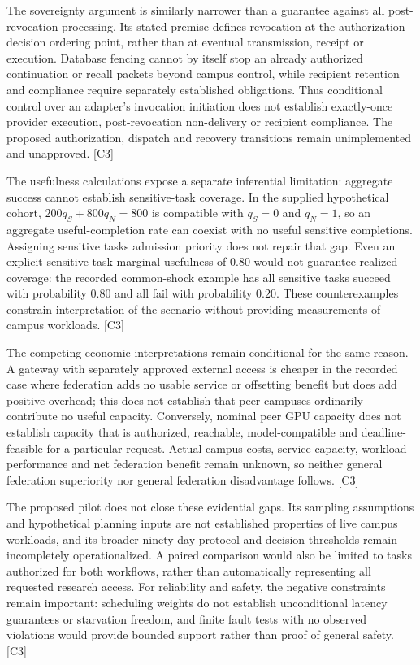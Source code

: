 \documentclass[11pt]{article}
\begin{document}
The sovereignty argument is similarly narrower than a guarantee against all post-revocation processing. Its stated premise defines revocation at the authorization-decision ordering point, rather than at eventual transmission, receipt or execution. Database fencing cannot by itself stop an already authorized continuation or recall packets beyond campus control, while recipient retention and compliance require separately established obligations. Thus conditional control over an adapter\textquoteright{}s invocation initiation does not establish exactly-once provider execution, post-revocation non-delivery or recipient compliance. The proposed authorization, dispatch and recovery transitions remain unimplemented and unapproved. [C3]

The usefulness calculations expose a separate inferential limitation: aggregate success cannot establish sensitive-task coverage. In the supplied hypothetical cohort, $200q_S+800q_N=800$ is compatible with $q_S=0$ and $q_N=1$, so an aggregate useful-completion rate can coexist with no useful sensitive completions. Assigning sensitive tasks admission priority does not repair that gap. Even an explicit sensitive-task marginal usefulness of $0.80$ would not guarantee realized coverage: the recorded common-shock example has all sensitive tasks succeed with probability $0.80$ and all fail with probability $0.20$. These counterexamples constrain interpretation of the scenario without providing measurements of campus workloads. [C3]

The competing economic interpretations remain conditional for the same reason. A gateway with separately approved external access is cheaper in the recorded case where federation adds no usable service or offsetting benefit but does add positive overhead; this does not establish that peer campuses ordinarily contribute no useful capacity. Conversely, nominal peer GPU capacity does not establish capacity that is authorized, reachable, model-compatible and deadline-feasible for a particular request. Actual campus costs, service capacity, workload performance and net federation benefit remain unknown, so neither general federation superiority nor general federation disadvantage follows. [C3]

The proposed pilot does not close these evidential gaps. Its sampling assumptions and hypothetical planning inputs are not established properties of live campus workloads, and its broader ninety-day protocol and decision thresholds remain incompletely operationalized. A paired comparison would also be limited to tasks authorized for both workflows, rather than automatically representing all requested research access. For reliability and safety, the negative constraints remain important: scheduling weights do not establish unconditional latency guarantees or starvation freedom, and finite fault tests with no observed violations would provide bounded support rather than proof of general safety. [C3]
\end{document}
